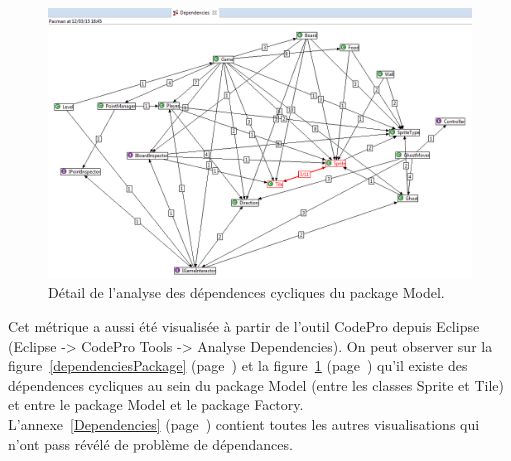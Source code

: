 \documentclass[12pt,a4paper,final]{article}
\newcommand{\annexe}[1]{annexe~\ref{#1} (page~\pageref{#1})}
\newcommand{\labelfigure}[1]{figure~\ref{#1} (page~\pageref{#1})}
\begin{document}
\begin{figure}[!h]
	\centering
	\includegraphics[width=\textwidth]{DependenciesModel.png}
	\caption{\label{dependenciesModel}Détail de l'analyse des dépendences cycliques du package Model.}
\end{figure}
Cet métrique a aussi été visualisée à partir de l'outil CodePro depuis Eclipse (Eclipse -> CodePro Tools -> Analyse Dependencies).
On peut observer sur la \labelfigure{dependenciesPackage} et la \labelfigure{dependenciesModel} qu'il existe des dépendences cycliques au sein du package Model (entre les classes Sprite et Tile) et entre le package Model et le package Factory.\\
L'\annexe{Dependencies} contient toutes les autres visualisations qui n'ont pass révélé de problème de dépendances.
\end{document}
